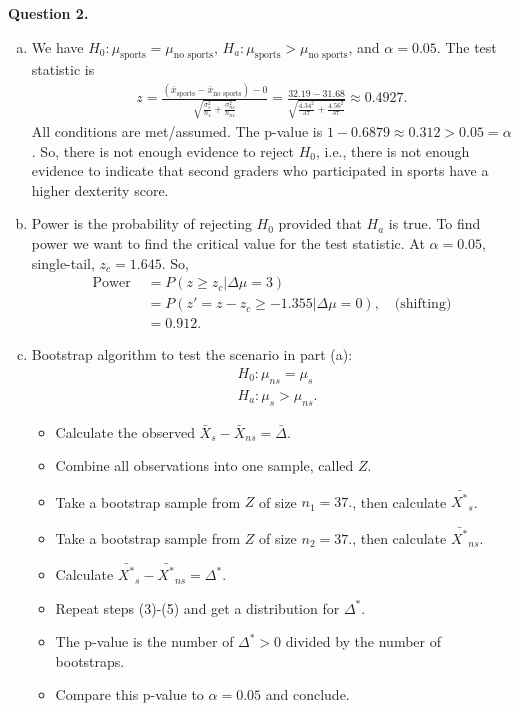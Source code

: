 \documentclass[11pt]{article}
\begin{document}
\noindent \textbf{Question 2.}
\begin{enumerate}[(a)]
	\item We have $H_0 : \mu_\text{sports} = \mu_\text{no sports}$, $H_a : \mu_\text{sports} > \mu_\text{no sports}$, and $\alpha = 0.05$. The test statistic is
	\begin{align*}
	z = \frac{(\bar{x}_\text{sports} - \bar{x}_\text{no sports}) - 0}{\sqrt{\frac{\sigma^2_s}{n_s} + \frac{\sigma^2_{ns}}{n_{ns}}}} = \frac{32.19 - 31.68}{\sqrt{\frac{4.34^2}{37} + \frac{4.56^2}{37}}} \approx 0.4927.
	\end{align*}
	All conditions are met/assumed. The p-value is $1-0.6879 \approx 0.312 > 0.05 = \alpha$. So, there is not enough evidence to reject $H_0$, i.e., there is not enough evidence to indicate that second graders who participated in sports have a higher dexterity score. 
	
	\item Power is the probability of rejecting $H_0$ provided that $H_a$ is true. To find power we want to find the critical value for the test statistic. At $\alpha = 0.05$, single-tail, $z_c = 1.645$. So,
	\begin{align*}
	\text{Power } &= P(z\geq z_c \vert \Delta \mu = 3)\\
	&= P(z' = z-z_c \geq -1.355 \vert \Delta \mu = 0), \quad \text{(shifting)}\\
	&= 0.912.
	\end{align*}
	
	
	\item Bootstrap algorithm to test the scenario in part (a):
	\begin{align*}
	&H_0 : \mu_{ns} = \mu_{s}\\
	&H_a : \mu_{s} > \mu_{ns}. 
	\end{align*}
	\begin{itemize}
		\item Calculate the observed $\bar{X}_s - \bar{X}_{ns} = \bar\Delta$. 
		\item Combine all observations into one sample, called $Z$.
		\item Take a bootstrap sample from $Z$ of size $n_1 = 37.$, then calculate $\bar{X^*}_s$.
		\item Take a bootstrap sample from $Z$ of size $n_2 = 37.$, then calculate $\bar{X^*}_{ns}$.
		\item Calculate $\bar{X^*}_s - \bar{X^*}_{ns} = {\Delta^*}$. 
		\item Repeat steps (3)-(5) and get a distribution for $\Delta^*$.
		\item The p-value is the number of $\Delta^* > 0$ divided by the number of bootstraps.
		\item Compare this p-value to $\alpha = 0.05$ and conclude.
	\end{itemize}
\end{enumerate}
\newpage
\end{document}
